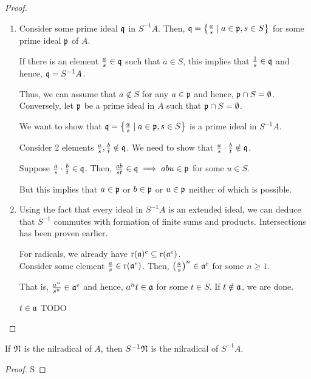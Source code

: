\begin{proof}
\begin{enumerate}
		\item
		Consider some prime ideal \(\mathfrak{q}\) in \(S^{-1}A\).
		Then, \(\mathfrak{q} = \left\{ \frac{a}{s} \mid a \in \mathfrak{p}, s \in S \right\}\)
		for some prime ideal \(\mathfrak{p}\) of \(A\).

		If there is an element \(\frac{a}{s} \in \mathfrak{q}\) such that
		\(a \in S\), this implies that \(\frac{1}{s} \in \mathfrak{q}\) and hence,
		\(\mathfrak{q} = S^{-1}A\).

		Thus, we can assume that \(a \notin S\) for any \(a \in \mathfrak{p}\)
		and hence, \(\mathfrak{p} \cap S = \emptyset\). \\

		Conversely, let \(\mathfrak{p}\) be a prime ideal in \(A\) such that
		\(\mathfrak{p} \cap S = \emptyset\).

		We want to show that \(\mathfrak{q} = \left\{ \frac{a}{s} \mid a \in \mathfrak{p},
		s \in S \right\}\) is a prime ideal in \(S^{-1}A\).

		Consider 2 elements \(\frac{a}{s}, \frac{b}{t} \notin \mathfrak{q}\).
		We need to show that \(\frac{a}{s} \cdot \frac{b}{t} \notin \mathfrak{q}\).

		Suppose \(\frac{a}{s} \cdot \frac{b}{t} \in \mathfrak{q}\).
		Then, \(\frac{ab}{st} \in \mathfrak{q} \implies abu \in \mathfrak{p}\)
		for some \(u \in S\).

		But this implies that \(a \in \mathfrak{p}\) or \(b \in \mathfrak{p}\) or
		\(u \in \mathfrak{p}\) neither of which is possible.

		\item
		Using the fact that every ideal in \(S^{-1}A\) is an extended ideal,
		we can deduce that \(S^{-1}\) commutes with formation of finite
		sums and products.
		Intersections has been proven earlier.

		For radicals, we already have \(\operatorname{r}(\mathfrak{a})^e \subseteq
		\operatorname{r}(\mathfrak{a}^e)\). \\
		Consider some element \(\frac{a}{s} \in \operatorname{r}(\mathfrak{a}^e)\).
		Then, \(\left( \frac{a}{s} \right)^n \in \mathfrak{a}^e\) for some \(n \geq 1\).

		That is, \(\frac{a^n}{s^n} \in \mathfrak{a}^e\) and hence,
		\(a^n t \in \mathfrak{a}\) for some \(t \in S\).
		If \(t \notin \mathfrak{a}\), we are done.

		\(t \in \mathfrak{a}\) TODO  %
	\end{enumerate}
\end{proof}


\begin{corollary}{}{}
	If \(\mathfrak{N}\) is the nilradical of \(A\), then \(S^{-1}\mathfrak{N}\) is the
	nilradical of \(S^{-1}A\).
\end{corollary}
\begin{proof}
	S
\end{proof}

